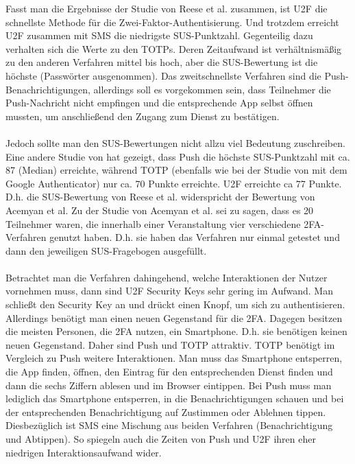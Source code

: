 Fasst man die Ergebnisse der Studie von Reese et al. \autocite{Reese} zusammen, ist U2F die 
schnellste Methode für die Zwei-Faktor-Authentisierung. Und trotzdem erreicht U2F 
zusammen mit SMS die niedrigste SUS-Punktzahl. Gegenteilig dazu verhalten sich die 
Werte zu den TOTPs. Deren Zeitaufwand ist verhältnismäßig zu den anderen Verfahren 
mittel bis hoch, aber die SUS-Bewertung ist die höchste (Passwörter ausgenommen). 
Das zweitschnellste Verfahren sind die Push-Benachrichtigungen, allerdings soll es 
vorgekommen sein, dass Teilnehmer die Push-Nachricht nicht empfingen und die 
entsprechende App selbst öffnen mussten, um anschließend den Zugang zum Dienst zu 
bestätigen. \autocite[10]{Reese}
\\\\
Jedoch sollte man den SUS-Bewertungen nicht allzu viel Bedeutung zuschreiben. Eine 
andere Studie von \textcite{Acemyan} hat gezeigt, dass Push die höchste 
SUS-Punktzahl mit ca. 87 (Median) erreichte, während TOTP (ebenfalls wie bei der Studie von \textcite{Reese} mit dem Google Authenticator) nur ca. 70 Punkte erreichte. U2F erreichte ca 
77 Punkte. D.h. die SUS-Bewertung von Reese et al. widerspricht der Bewertung von 
Acemyan et al. Zu der Studie von Acemyan et al. sei zu sagen, dass es 20 Teilnehmer 
waren, die innerhalb einer Veranstaltung vier verschiedene 2FA-Verfahren genutzt 
haben. D.h. sie haben das Verfahren nur einmal getestet und dann den jeweiligen 
SUS-Fragebogen ausgefüllt. \autocite{Acemyan}
\\\\
Betrachtet man die Verfahren dahingehend, welche Interaktionen der Nutzer vornehmen 
muss, dann sind U2F Security Keys sehr gering im Aufwand. Man schließt den Security 
Key an und drückt einen Knopf, um sich zu authentisieren. Allerdings benötigt man 
einen neuen Gegenstand für die 2FA. Dagegen besitzen die meisten Personen, 
die 2FA nutzen, ein Smartphone. D.h. sie benötigen keinen neuen Gegenstand. Daher 
sind Push und TOTP attraktiv. TOTP benötigt im Vergleich zu Push 
weitere Interaktionen. Man muss das Smartphone entsperren, die App finden, öffnen, 
den Eintrag für den entsprechenden Dienst finden und dann die sechs Ziffern ablesen 
und im Browser eintippen. Bei Push muss man lediglich das Smartphone entsperren, in 
die Benachrichtigungen schauen und bei der entsprechenden Benachrichtigung auf 
\glqq Zustimmen\grqq{} oder \glqq Ablehnen\grqq{} tippen. Diesbezüglich ist SMS eine Mischung aus beiden 
Verfahren (Benachrichtigung und Abtippen). So spiegeln auch die Zeiten von Push und 
U2F ihren eher niedrigen Interaktionsaufwand wider.
